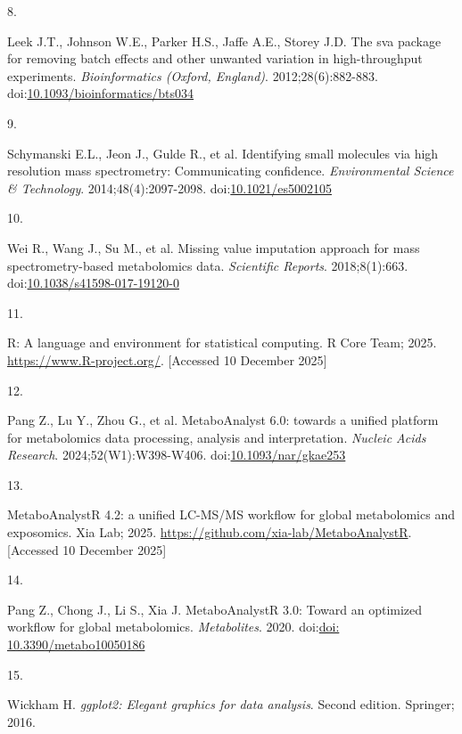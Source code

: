 \documentclass[
]{article}
\newlength{\cslhangindent}
\newlength{\csllabelwidth}
\newenvironment{CSLReferences}[2] %
 {\begin{list}{}{%
  \setlength{\itemindent}{0pt}
  \setlength{\leftmargin}{0pt}
  \setlength{\parsep}{0pt}
  \ifodd #1
   \setlength{\leftmargin}{\cslhangindent}
   \setlength{\itemindent}{-1\cslhangindent}
  \fi
  \setlength{\itemsep}{#2\baselineskip}}}
 {\end{list}}
\newcommand{\CSLLeftMargin}[1]{\parbox[t]{\csllabelwidth}{\strut#1\strut}}
\newcommand{\CSLRightInline}[1]{\parbox[t]{\linewidth - \csllabelwidth}{\strut#1\strut}}
\begin{document}
\begin{CSLReferences}{0}{1}
\CSLLeftMargin{8. }%
\CSLRightInline{Leek J.T., Johnson W.E., Parker H.S., Jaffe A.E., Storey
J.D. The sva package for removing batch effects and other unwanted
variation in high-throughput experiments. \emph{Bioinformatics (Oxford,
England)}. 2012;28(6):882-883.
doi:\href{https://doi.org/10.1093/bioinformatics/bts034}{10.1093/bioinformatics/bts034}}

\CSLLeftMargin{9. }%
\CSLRightInline{Schymanski E.L., Jeon J., Gulde R., et al. Identifying
small molecules via high resolution mass spectrometry: Communicating
confidence. \emph{Environmental Science \& Technology}.
2014;48(4):2097-2098.
doi:\href{https://doi.org/10.1021/es5002105}{10.1021/es5002105}}

\CSLLeftMargin{10. }%
\CSLRightInline{Wei R., Wang J., Su M., et al. Missing value imputation
approach for mass spectrometry-based metabolomics data. \emph{Scientific
Reports}. 2018;8(1):663.
doi:\href{https://doi.org/10.1038/s41598-017-19120-0}{10.1038/s41598-017-19120-0}}

\CSLLeftMargin{11. }%
\CSLRightInline{{R}: A language and environment for statistical
computing. {R Core Team}; 2025. \url{https://www.R-project.org/}.
{[}Accessed 10 December 2025{]}}

\CSLLeftMargin{12. }%
\CSLRightInline{Pang Z., Lu Y., Zhou G., et al. {MetaboAnalyst} 6.0:
{towards} a unified platform for metabolomics data processing, analysis
and interpretation. \emph{Nucleic Acids Research}.
2024;52(W1):W398-W406.
doi:\href{https://doi.org/10.1093/nar/gkae253}{10.1093/nar/gkae253}}

\CSLLeftMargin{13. }%
\CSLRightInline{{MetaboAnalystR} 4.2: {a} unified {LC-MS/MS} workflow
for global metabolomics and exposomics. {Xia Lab}; 2025.
\url{https://github.com/xia-lab/MetaboAnalystR}. {[}Accessed 10 December
2025{]}}

\CSLLeftMargin{14. }%
\CSLRightInline{Pang Z., Chong J., Li S., Xia J. {MetaboAnalystR} 3.0:
Toward an optimized workflow for global metabolomics.
\emph{Metabolites}. 2020.
doi:\href{https://doi.org/doi:\%2010.3390/metabo10050186}{doi:
10.3390/metabo10050186}}

\CSLLeftMargin{15. }%
\CSLRightInline{Wickham H. \emph{ggplot2: Elegant graphics for data
analysis}. Second edition. Springer; 2016.}


\end{CSLReferences}
\end{document}
